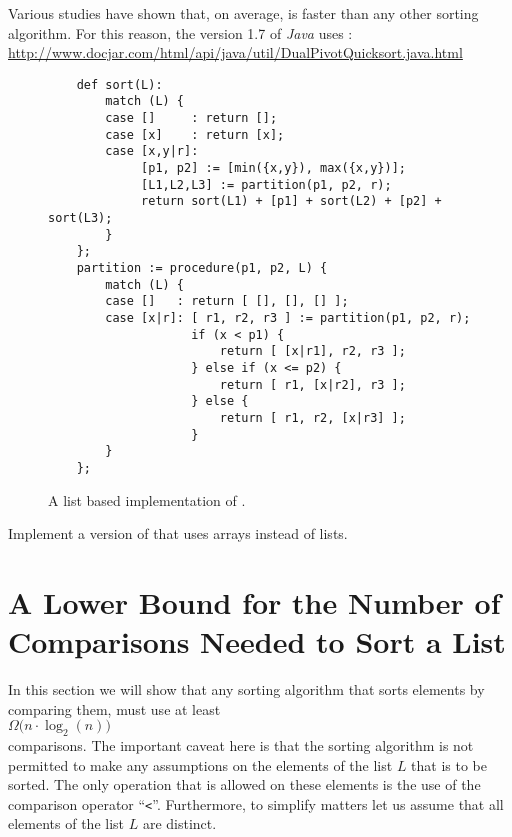 \begin{enumerate}
      Various studies have shown that, on average,  is faster than any other sorting
      algorithm.  For this reason, the version 1.7 of \textsl{Java} uses :
      \\[0.2cm]
      \hspace*{0.3cm}
      \href{http://www.docjar.com/html/api/java/util/DualPivotQuicksort.java.html}{http://www.docjar.com/html/api/java/util/DualPivotQuicksort.java.html} 
\end{enumerate}

\begin{figure}[!ht]
\centering
\begin{verbatim}
    def sort(L):
        match (L) {
        case []     : return [];
        case [x]    : return [x];
        case [x,y|r]: 
             [p1, p2] := [min({x,y}), max({x,y})];
             [L1,L2,L3] := partition(p1, p2, r);
             return sort(L1) + [p1] + sort(L2) + [p2] + sort(L3);
        }
    };
    partition := procedure(p1, p2, L) {
        match (L) {
        case []   : return [ [], [], [] ];
        case [x|r]: [ r1, r2, r3 ] := partition(p1, p2, r);
                    if (x < p1) {
                        return [ [x|r1], r2, r3 ];
                    } else if (x <= p2) {
                        return [ r1, [x|r2], r3 ];
                    } else {
                        return [ r1, r2, [x|r3] ];
                    }
        }
    };
\end{verbatim}
\vspace*{-0.3cm}
\caption{A list based implementation of .}
\label{fig:dual-pivot-quick-sort.stlx}
\end{figure}

\exercise
Implement a version of  that uses arrays instead of lists.


\section[A Lower Bound]{A Lower Bound for the Number of Comparisons Needed to Sort a List}
In this section we will show that any sorting algorithm that sorts elements by comparing them, must
use at least 
\\[0.2cm]
\hspace*{1.3cm}
 $\Omega\bigl(n \cdot \log_2(n)\bigr)$ 
\\[0.2cm]
comparisons.  The important caveat here is that the sorting algorithm is not permitted to make any assumptions
on the elements of the list $L$ that is to be sorted.  The only operation that is allowed on these
elements is the use of the comparison operator ``\texttt{<}''.  Furthermore, to simplify matters let
us assume that all elements of the list $L$ are distinct.

